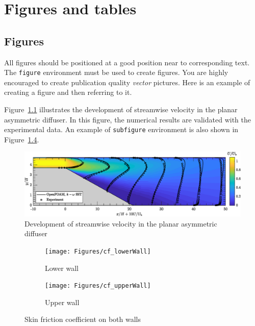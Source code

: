 \chapter{Figures and tables}

\section{Figures}
All figures should be positioned at a good position near to corresponding text. The \verb|figure| environment must be used to create figures. You are highly encouraged to create publication quality \emph{vector} pictures. Here is an example of creating a figure and then referring to it.

Figure~\ref{fig:CoverPic} illustrates the development of streamwise velocity in the planar asymmetric diffuser. In this figure, the numerical results are validated with the experimental data. An example of \verb|subfigure| environment is also shown in Figure~\ref{fig:Cf}.
 
\begin{figure}[!htbp]
	\centering
	\includegraphics[width=1\textwidth]{Figures/CoverPic}
	\caption{Development of streamwise velocity in the planar asymmetric diffuser}
	\label{fig:CoverPic}
\end{figure} 



\begin{figure}[!hbpt]
	\centering
	\begin{subfigure}[t]{0.48\textwidth}
		\centering
		\texttt{[image: Figures/cf\_lowerWall]}
		\caption{Lower wall}
		\label{fig:Cf_L}
	\end{subfigure}
	\hspace{0.02\textwidth}
	\begin{subfigure}[t]{0.48\textwidth}
		\centering
		\texttt{[image: Figures/cf\_upperWall]}
		\caption{Upper wall}
		\label{fig:Cf_U}
	\end{subfigure}
	\caption{Skin friction coefficient on both walls}
	\label{fig:Cf}
\end{figure}



